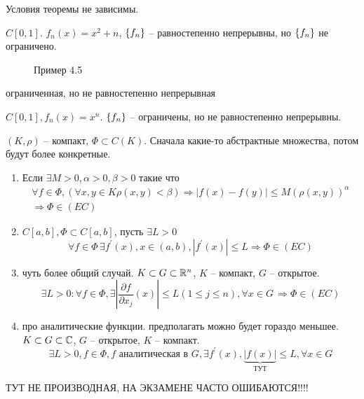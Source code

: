 \documentclass[document]{subfiles}
\begin{document}
\begin{remark}
    Условия теоремы не зависимы.
\end{remark}

\begin{example}
    $C[0,1]$. $f_n(x) = x^2 + n$, $\left\{f_n\right\}$ -- равностепенно непрерывны, но $\left\{f_n\right\}$ не ограничено.
    \begin{figure}
        \centering
        \caption{Пример 4.5}
    \end{figure}
    
\end{example}

ограниченная, но не равностепенно непрерывная
\begin{example}
    $C[0,1], f_n(x) = x^n$. $\left\{f_n\right\}$ -- ограничены, но не равностепенно непрерывны.
\end{example}


\begin{theoremwobox}
    $(K, \rho)$ -- компакт, $\Phi \subset C(K)$.
    Сначала какие-то абстрактные множества, потом будут более конкретные.
    \begin{enumerate}
        \item Если $\exists M > 0, \alpha > 0, \beta > 0$ такие что 
        \begin{multline*}
            \forall f \in \Phi, (\forall x,y \in K \rho(x,y) < \beta) \Rightarrow |f(x) - f(y)| \leq M(\rho(x,y))^\alpha \\
            \Rightarrow \Phi \in (EC)
        \end{multline*}
        \item $C[a,b], \Phi \subset C[a,b]$, пусть $\exists L > 0$ 
        \[ \forall f \in \Phi \, \exists f^\prime(x), x \in (a,b), |f^\prime(x)| \leq L \Rightarrow \Phi \in (EC) \]
        \item чуть более общий случай. $K \subset G \subset \mathbb{R}^n$, $K$ -- компакт, $G$ -- открытое.
        \[ \exists L > 0 : \forall f \in \Phi, \exists \left| \frac{\partial f}{\partial x_j}  (x) \right| \leq L (1 \leq j \leq n), \forall x \in G \,  \Rightarrow \Phi \in (EC)  \] 
        \item про аналитические функции. предполагать можно будет гораздо меньшее. 
        $K \subset G \subset \mathbb{C}$, $G$ -- открытое, $K$ -- компакт. 
        \[ \exists L > 0, f \in \Phi, f \text{ аналитическая в } G, \exists f^\prime(x), \underbrace{|f(x)|}_{\text{ТУТ}} \leq L, \forall x \in G \] 
    \end{enumerate}
        ТУТ НЕ ПРОИЗВОДНАЯ, НА ЭКЗАМЕНЕ ЧАСТО ОШИБАЮТСЯ!!!!
\end{theoremwobox}
\end{document}
